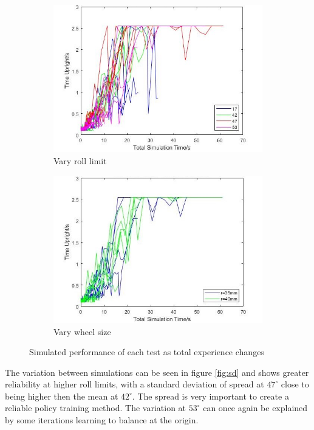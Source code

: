 \documentclass[twoside,twocolumn,12pt]{article}
\begin{document}
\begin{figure}[h!]
  \centering
  \begin{subfigure}[t]{0.5\textwidth}
    \includegraphics[width=\linewidth]{all_angle}
   \caption{Vary roll limit}
  \label{fig:wxro}
  \end{subfigure}
  \newline
  \begin{subfigure}[t]{0.5\textwidth}
    \includegraphics[width=\linewidth]{all_wheel}
    \caption{Vary wheel size}
  \label{fig:exwh}
  \end{subfigure}
  \caption{Simulated performance of each test as total experience changes}
  \label{fig:exti}
\end{figure}
The variation between simulations can be seen in figure \ref{fig:sd} and shows greater reliability at higher roll limits, with a standard deviation of spread at $47^{\circ}$ close to being higher then the mean at $42^{\circ}$. The spread is very important to create a reliable policy training method. The variation at $53^{\circ}$ can once again be explained by some iterations learning to balance at the origin.
\end{document}

